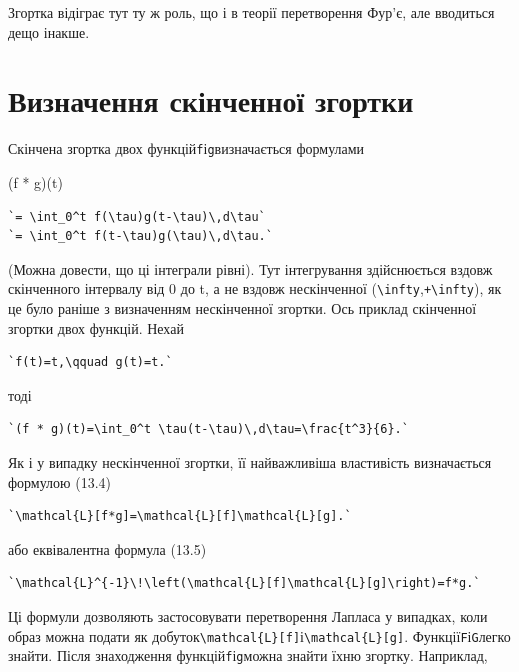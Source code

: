 \documentclass[
  ukrainian,
]{article}
\begin{document}
Згортка відіграє тут ту ж роль, що і в теорії перетворення Фур'є, але
вводиться дещо інакше.

\section{Визначення скінченної
згортки}\label{ux432ux438ux437ux43dux430ux447ux435ux43dux43dux44f-ux441ux43aux456ux43dux447ux435ux43dux43dux43eux457-ux437ux433ux43eux440ux442ux43aux438}

Скінчена згортка двох функцій\texttt{f}і\texttt{g}визначається формулами

(f * g)(t)

\begin{verbatim}
`= \int_0^t f(\tau)g(t-\tau)\,d\tau`
`= \int_0^t f(t-\tau)g(\tau)\,d\tau.`
\end{verbatim}

(Можна довести, що ці інтеграли рівні). Тут інтегрування здійснюється
вздовж скінченного інтервалу від 0 до t, а не вздовж нескінченної
(\texttt{\textbackslash{}infty},\texttt{+\textbackslash{}infty}), як це
було раніше з визначенням нескінченної згортки. Ось приклад скінченної
згортки двох функцій. Нехай

\begin{verbatim}
`f(t)=t,\qquad g(t)=t.`
\end{verbatim}

тоді

\begin{verbatim}
`(f * g)(t)=\int_0^t \tau(t-\tau)\,d\tau=\frac{t^3}{6}.`
\end{verbatim}

Як і у випадку нескінченної згортки, її найважливіша властивість
визначається формулою (13.4)

\begin{verbatim}
`\mathcal{L}[f*g]=\mathcal{L}[f]\mathcal{L}[g].`
\end{verbatim}

або еквівалентна формула (13.5)

\begin{verbatim}
`\mathcal{L}^{-1}\!\left(\mathcal{L}[f]\mathcal{L}[g]\right)=f*g.`
\end{verbatim}

Ці формули дозволяють застосовувати перетворення Лапласа у випадках,
коли образ можна подати як
добуток\texttt{\textbackslash{}mathcal\{L\}{[}f{]}}і\texttt{\textbackslash{}mathcal\{L\}{[}g{]}}.
Функції\texttt{F}і\texttt{G}легко знайти. Після знаходження
функцій\texttt{f}і\texttt{g}можна знайти їхню згортку. Наприклад,
\end{document}
